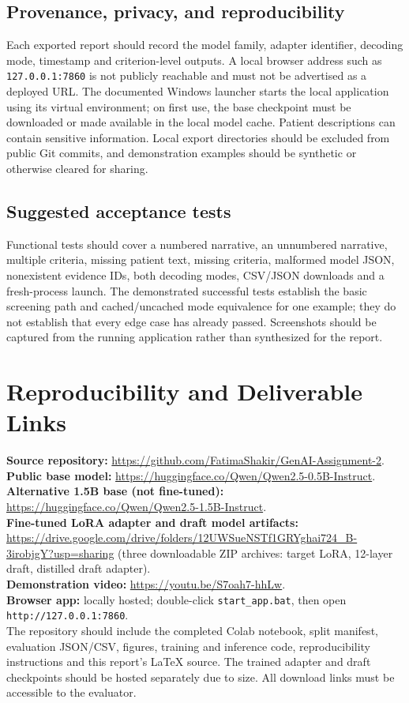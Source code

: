 \documentclass[conference]{IEEEtran}
\begin{document}
\subsection{Provenance, privacy, and reproducibility}
Each exported report should record the model family, adapter identifier, decoding mode, timestamp and criterion-level outputs. A local browser address such as \texttt{127.0.0.1:7860} is not publicly reachable and must not be advertised as a deployed URL. The documented Windows launcher starts the local application using its virtual environment; on first use, the base checkpoint must be downloaded or made available in the local model cache. Patient descriptions can contain sensitive information. Local export directories should be excluded from public Git commits, and demonstration examples should be synthetic or otherwise cleared for sharing.

\subsection{Suggested acceptance tests}
Functional tests should cover a numbered narrative, an unnumbered narrative, multiple criteria, missing patient text, missing criteria, malformed model JSON, nonexistent evidence IDs, both decoding modes, CSV/JSON downloads and a fresh-process launch. The demonstrated successful tests establish the basic screening path and cached/uncached mode equivalence for one example; they do not establish that every edge case has already passed. Screenshots should be captured from the running application rather than synthesized for the report.

\section{Reproducibility and Deliverable Links}
\noindent\textbf{Source repository:} \url{https://github.com/FatimaShakir/GenAI-Assignment-2}.\\
\textbf{Public base model:} \url{https://huggingface.co/Qwen/Qwen2.5-0.5B-Instruct}.\\
\textbf{Alternative 1.5B base (not fine-tuned):} \url{https://huggingface.co/Qwen/Qwen2.5-1.5B-Instruct}.\\
\textbf{Fine-tuned LoRA adapter and draft model artifacts:} \url{https://drive.google.com/drive/folders/12UWSueNSTf1GRYghai724_B-3irobjgY?usp=sharing} (three downloadable ZIP archives: target LoRA, 12-layer draft, distilled draft adapter).\\
\textbf{Demonstration video:} \url{https://youtu.be/S7oah7-hhLw}.\\
\textbf{Browser app:} locally hosted; double-click \texttt{start\_app.bat}, then open \texttt{http://127.0.0.1:7860}.\\
The repository should include the completed Colab notebook, split manifest, evaluation JSON/CSV, figures, training and inference code, reproducibility instructions and this report's LaTeX source. The trained adapter and draft checkpoints should be hosted separately due to size. All download links must be accessible to the evaluator.
\end{document}
